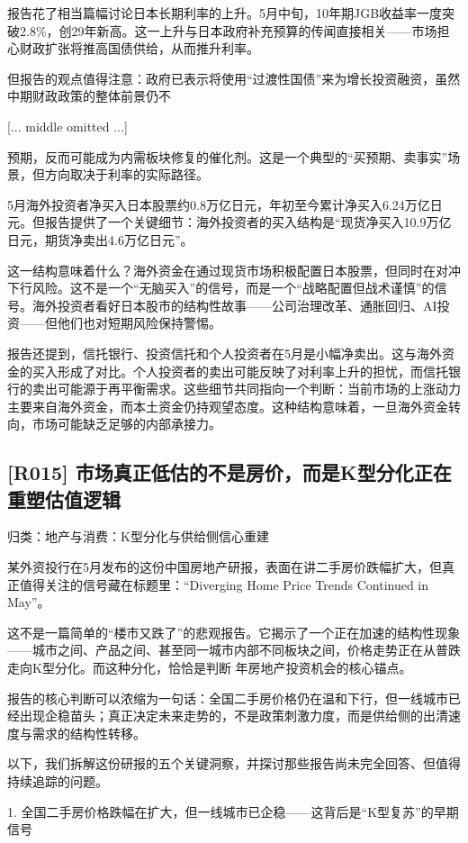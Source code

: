 \documentclass[11pt]{ctexart}
\begin{document}
报告花了相当篇幅讨论日本长期利率的上升。5月中旬，10年期JGB收益率一度突破2.8\%，创29年新高。这一上升与日本政府补充预算的传闻直接相关——市场担心财政扩张将推高国债供给，从而推升利率。

但报告的观点值得注意：政府已表示将使用“过渡性国债”来为增长投资融资，虽然中期财政政策的整体前景仍不

[... middle omitted ...]

预期，反而可能成为内需板块修复的催化剂。这是一个典型的“买预期、卖事实”场景，但方向取决于利率的实际路径。

5月海外投资者净买入日本股票约0.8万亿日元，年初至今累计净买入6.24万亿日元。但报告提供了一个关键细节：海外投资者的买入结构是“现货净买入10.9万亿日元，期货净卖出4.6万亿日元”。

这一结构意味着什么？海外资金在通过现货市场积极配置日本股票，但同时在对冲下行风险。这不是一个“无脑买入”的信号，而是一个“战略配置但战术谨慎”的信号。海外投资者看好日本股市的结构性故事——公司治理改革、通胀回归、AI投资——但他们也对短期风险保持警惕。

报告还提到，信托银行、投资信托和个人投资者在5月是小幅净卖出。这与海外资金的买入形成了对比。个人投资者的卖出可能反映了对利率上升的担忧，而信托银行的卖出可能源于再平衡需求。这些细节共同指向一个判断：当前市场的上涨动力主要来自海外资金，而本土资金仍持观望态度。这种结构意味着，一旦海外资金转向，市场可能缺乏足够的内部承接力。

\subsection{[R015] 市场真正低估的不是房价，而是K型分化正在重塑估值逻辑}
{\small\color{refgray}归类：地产与消费：K型分化与供给侧信心重建}

某外资投行在5月发布的这份中国房地产研报，表面在讲二手房价跌幅扩大，但真正值得关注的信号藏在标题里：“Diverging Home Price Trends Continued in May”。

这不是一篇简单的“楼市又跌了”的悲观报告。它揭示了一个正在加速的结构性现象——城市之间、产品之间、甚至同一城市内部不同板块之间，价格走势正在从普跌走向K型分化。而这种分化，恰恰是判断 年房地产投资机会的核心锚点。

报告的核心判断可以浓缩为一句话：全国二手房价格仍在温和下行，但一线城市已经出现企稳苗头；真正决定未来走势的，不是政策刺激力度，而是供给侧的出清速度与需求的结构性转移。

以下，我们拆解这份研报的五个关键洞察，并探讨那些报告尚未完全回答、但值得持续追踪的问题。

1. 全国二手房价格跌幅在扩大，但一线城市已企稳——这背后是“K型复苏”的早期信号
\end{document}
